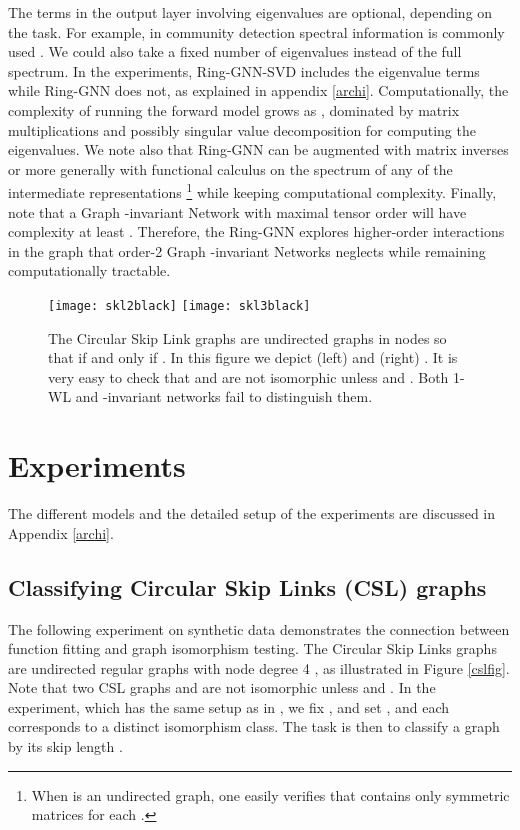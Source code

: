 \documentclass{article}
\begin{document}
The terms in the output layer involving eigenvalues are optional, depending on the task. For example, in community detection spectral information is commonly used \cite{krzakala2013spectral}. We could also take a fixed number of eigenvalues instead of the full spectrum. In the experiments, Ring-GNN-SVD includes the eigenvalue terms while Ring-GNN does not, as explained in appendix \ref{archi}. Computationally, the complexity of running the forward model grows as , dominated by matrix multiplications and possibly singular value decomposition for computing the eigenvalues. 
We note also that Ring-GNN can be augmented with matrix inverses or more generally with functional calculus on the spectrum of any of the intermediate representations \footnote{When  is an undirected graph, one easily verifies that  contains only symmetric matrices for each .} while keeping  computational complexity.
Finally, note that a Graph -invariant Network with maximal tensor order  will have complexity at least . Therefore, the Ring-GNN explores higher-order interactions in the graph that order-2 Graph -invariant Networks neglects while remaining computationally tractable.



\begin{figure}
    \label{cslfig}
    \centering
    \texttt{[image: skl2black]}
    \texttt{[image: skl3black]}
    \caption{The Circular Skip Link graphs  are undirected graphs in  nodes  so that  if and only if . In this figure we depict (left)  and (right) . It is very easy to check that  and  are not isomorphic unless  and . Both 1-WL and -invariant networks fail to distinguish them. \vspace{-10pt}}
    \label{fig.skiplength}
\end{figure}

\section{Experiments}
\label{experiments}
The different models and the detailed setup of the experiments are discussed in Appendix \ref{archi}.

\subsection{Classifying Circular Skip Links (CSL) graphs}
\label{cslexp}
The following experiment on synthetic data demonstrates the connection between function fitting and graph isomorphism testing. The Circular Skip Links graphs are undirected regular graphs with node degree 4 \cite{murphy2019relational}, as illustrated in Figure \ref{cslfig}. Note that two CSL graphs  and  are not isomorphic unless  and . In the experiment, which has the same setup as in \cite{murphy2019relational}, we fix , and set , and each  corresponds to a distinct isomorphism class. The task is then to classify a graph  by its skip length .
\end{document}
